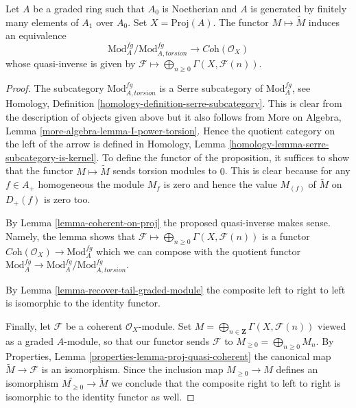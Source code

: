 \begin{proposition}
\label{proposition-coherent-modules-on-proj}
Let $A$ be a graded ring such that $A_0$ is Noetherian and $A$ is generated
by finitely many elements of $A_1$ over $A_0$.
Set $X = \text{Proj}(A)$. The functor $M \mapsto \widetilde M$
induces an equivalence
$$
\text{Mod}^{fg}_A/\text{Mod}^{fg}_{A, torsion}
\longrightarrow
\textit{Coh}(\mathcal{O}_X)
$$
whose quasi-inverse is given by
$\mathcal{F} \longmapsto \bigoplus_{n \geq 0} \Gamma(X, \mathcal{F}(n))$.
\end{proposition}

\begin{proof}
The subcategory $\text{Mod}^{fg}_{A, torsion}$ is a Serre subcategory
of $\text{Mod}^{fg}_A$, see
Homology, Definition \ref{homology-definition-serre-subcategory}.
This is clear from the description of objects given above but it also follows
from More on Algebra, Lemma \ref{more-algebra-lemma-I-power-torsion}.
Hence the quotient category on the left of the arrow is defined
in Homology, Lemma \ref{homology-lemma-serre-subcategory-is-kernel}.
To define the functor of the proposition, it suffices to show that
the functor $M \mapsto \widetilde M$ sends torsion modules to $0$.
This is clear because for any $f \in A_+$ homogeneous the
module $M_f$ is zero and hence the value $M_{(f)}$ of $\widetilde M$
on $D_+(f)$ is zero too.

\medskip\noindent
By Lemma \ref{lemma-coherent-on-proj} the proposed quasi-inverse
makes sense. Namely, the lemma shows that
$\mathcal{F} \longmapsto \bigoplus_{n \geq 0} \Gamma(X, \mathcal{F}(n))$
is a functor $\textit{Coh}(\mathcal{O}_X) \to \text{Mod}^{fg}_A$
which we can compose with the quotient functor
$\text{Mod}^{fg}_A \to \text{Mod}^{fg}_A/\text{Mod}^{fg}_{A, torsion}$.

\medskip\noindent
By Lemma \ref{lemma-recover-tail-graded-module}
the composite left to right to left is isomorphic to the identity functor.

\medskip\noindent
Finally, let $\mathcal{F}$ be a coherent $\mathcal{O}_X$-module.
Set $M = \bigoplus_{n \in \mathbf{Z}} \Gamma(X, \mathcal{F}(n))$
viewed as a graded $A$-module, so that our functor sends $\mathcal{F}$ to
$M_{\geq 0} = \bigoplus_{n \geq 0} M_n$.
By Properties, Lemma \ref{properties-lemma-proj-quasi-coherent}
the canonical map $\widetilde M \to \mathcal{F}$
is an isomorphism. Since the inclusion map
$M_{\geq 0} \to M$ defines an isomorphism
$\widetilde{M_{\geq 0}} \to \widetilde M$ we conclude that
the composite right to left to right is isomorphic to the identity
functor as well.
\end{proof}






